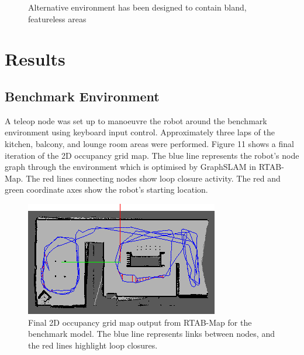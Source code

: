 \documentclass[a4paper]{article}
\begin{document}
\begin{figure}[h]
\centering
{}
\caption{Alternative environment has been designed to contain bland, featureless areas}
\end{figure}

\section{Results}
\subsection{Benchmark Environment}
A teleop node was set up to manoeuvre the robot around the benchmark environment using keyboard input control. Approximately three laps of the kitchen, balcony, and lounge room areas were performed. Figure 11 shows a final iteration of the 2D occupancy grid map. The blue line represents the robot's node graph through the environment which is optimised by GraphSLAM in RTAB-Map. The red lines connecting nodes show loop closure activity. The red and green coordinate axes show the robot's starting location.
\begin{figure}[h]
\centering
\includegraphics[scale=0.8]{kitchen_graph_view}
\caption{Final 2D occupancy grid map output from RTAB-Map for the benchmark model. The blue line represents links between nodes, and the red lines highlight loop closures.}
\end{figure}
\end{document}
